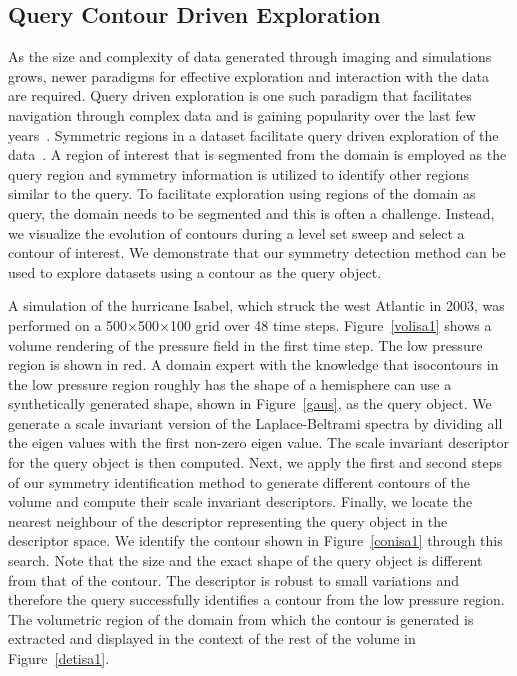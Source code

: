 \documentclass[review,journal]{vgtc}         %
\begin{document}
\subsection{Query Contour Driven Exploration}
As the size and complexity of data generated through imaging and simulations
grows, newer paradigms for effective exploration and interaction with
the data are required. Query driven exploration is one such paradigm that
facilitates navigation through complex data and is gaining popularity over the last few
years~\cite{BeyerAKLPH13,LiuJH13}. Symmetric regions in a dataset facilitate query
driven exploration of the data~\cite{ThomN13,MasoodTN13}. A region of interest that is segmented from 
the domain is employed as the query region and symmetry information is utilized to identify
other regions similar to the query. To facilitate exploration using regions of the domain as query, the domain 
needs to be segmented and this is often a challenge. Instead, we visualize the
evolution of contours during a level set sweep and select a contour of interest. 
We demonstrate that our symmetry detection method can be used to explore datasets using a contour as the query object.

A simulation of the hurricane Isabel, which struck the west Atlantic in 2003, was performed
on a 500$\times$500$\times$100 grid over 48 time steps. Figure~\ref{volisa1} shows a volume rendering
of the pressure field in the first time step. The low pressure region
is shown in red. A domain expert with the knowledge that isocontours in the low pressure region
roughly has the shape of a hemisphere can use a synthetically generated shape, shown in 
Figure~\ref{gaus}, as the query object. We generate a scale invariant version of the Laplace-Beltrami
spectra by dividing all the eigen values with the first non-zero eigen value. The scale invariant
descriptor for the query object is then computed. Next, we apply the first and second steps of
our symmetry identification method to generate different contours of the 
volume and compute their scale invariant descriptors. Finally, we locate the nearest neighbour of the descriptor 
representing the query object in the descriptor space. We identify the contour
shown in Figure~\ref{conisa1} through this search. Note that the size and the exact shape of the
query object is different from that of the contour.
The descriptor is robust to small variations and therefore the query successfully identifies 
a contour from the low pressure region. The volumetric region of the domain from which the contour
is generated is extracted and displayed in the context of the rest of the volume in 
Figure~\ref{detisa1}. 
\end{document}
